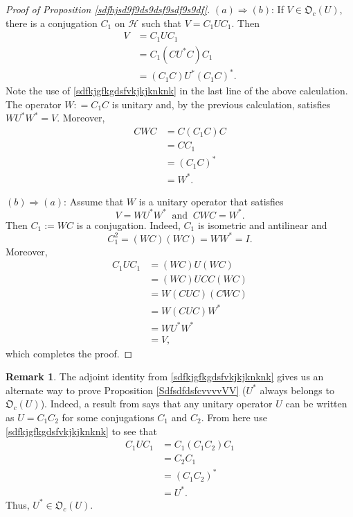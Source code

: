 \documentclass{dis}
\theoremstyle{plain}
\theoremstyle{definition}
\newtheorem{Remark}[equation]{Remark}
\newcommand{\0}{{\color{lightgray}0}}
\begin{document}
\begin{proof}[Proof of Proposition \ref{sdfhjsd9f9ds9dsf9sdf9s9df}]
$(a) \Longrightarrow (b)$: If $V \in \mathfrak{O}_c(U)$,  there is a conjugation $C_1$ on $\mathcal{H}$ such that $V = C_1 U C_1$.
Then
\begin{align*}
V & = C_1 U C_1\\
& = C_1 (C U^{*} C) C_{1}\\
& = (C_1 C) U^{*} (C_1 C)^{*}.
\end{align*}
Note the use of \eqref{sdfkjgfkgdsfvkjkjknknk} in the last line of the above calculation.  The operator $W : = C_1 C$ is unitary and, by the previous calculation,  satisfies $W U^{*} W^{*} = V$. Moreover, 
\begin{align*}
C W C & = C (C_1 C) C\\
& = C C_1\\
& = (C_1 C)^{*}\\
& = W^{*}.
\end{align*}

$(b) \Longrightarrow (a)$: Assume that $W$ is a unitary operator that satisfies  
$$V = W U^{*} W^{*} \; \; \mbox{and} \; \; C W C = W^{*}.$$ Then $C_1 := W C$ is a conjugation. Indeed, $C_1$ is isometric and antilinear and 
$$C_{1}^{2} = (WC)(WC) = W W^{*} = I.$$ Moreover, 
\begin{align*}
C_1 U C_1 & = (W C) U (W C)\\
& = (WC) U C C (WC)\\
& = W(C U C)( C WC)\\
& = W (C U C) W^{*}\\
& = W U^{*} W^{*}\\
& = V,
\end{align*}
which completes the proof.
\end{proof}

\begin{Remark}\label{2..99999}
The adjoint identity from \eqref{sdfkjgfkgdsfvkjkjknknk} gives us an alternate way to prove Proposition \ref{SdfsdfdsfcvvvvVV} ($U^{*}$ always belongs to $\mathfrak{O}_c(U)$). Indeed, a result from \cite{MR0190750}  says that any unitary operator $U$ can be written as $U = C_1 C_2$ for some conjugations $C_1$ and $C_2$. From here use \eqref{sdfkjgfkgdsfvkjkjknknk} to  see that 
\begin{align*}
C_1 U C_1 & = C_1 (C_1 C_2) C_1\\
& = C_2 C_1\\
& = (C_1 C_2)^{*}\\
& = U^{*}.
\end{align*}
Thus, $U^{*} \in \mathfrak{O}_c(U)$. 
\end{Remark}
\end{document}
